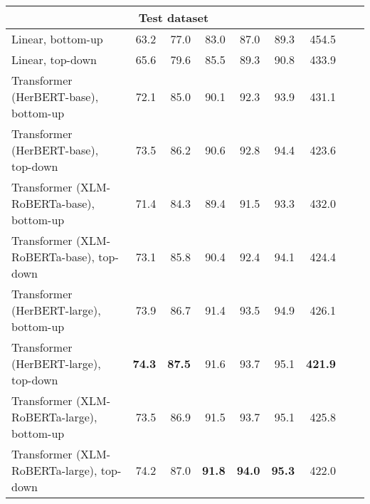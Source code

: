 \begin{table}[ht!]
{\begin{tabular}{lrrrrrrrr}
   \hline \multicolumn{7}{c}{\textbf{Test dataset}} \\ \hline
Linear, bottom-up & 63.2 & 77.0 & 83.0 & 87.0 & 89.3 & 454.5 \\ 
  Linear, top-down & 65.6 & 79.6 & 85.5 & 89.3 & 90.8 & 433.9 \\ 
  Transformer (HerBERT-base), bottom-up & 72.1 & 85.0 & 90.1 & 92.3 & 93.9 & 431.1 \\ 
  Transformer (HerBERT-base), top-down & 73.5 & 86.2 & 90.6 & 92.8 & 94.4 & 423.6 \\ 
  Transformer (XLM-RoBERTa-base), bottom-up & 71.4 & 84.3 & 89.4 & 91.5 & 93.3 & 432.0 \\ 
  Transformer (XLM-RoBERTa-base), top-down & 73.1 & 85.8 & 90.4 & 92.4 & 94.1 & 424.4 \\ 
  Transformer (HerBERT-large), bottom-up & 73.9 & 86.7 & 91.4 & 93.5 & 94.9 & 426.1 \\ 
  Transformer (HerBERT-large), top-down & \textbf{74.3} & \textbf{87.5} & 91.6 & 93.7 & 95.1 & \textbf{421.9} \\ 
  Transformer (XLM-RoBERTa-large), bottom-up & 73.5 & 86.9 & 91.5 & 93.7 & 95.1 & 425.8 \\ 
  Transformer (XLM-RoBERTa-large), top-down & 74.2 & 87.0 & \textbf{91.8} & \textbf{94.0} & \textbf{95.3} & 422.0 \\ 
   \hline
\end{tabular}
}
\end{table}




